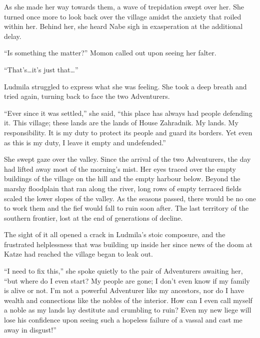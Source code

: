  

As she made her way towards them, a wave of trepidation swept over her. She turned once more to look back over the village amidst the anxiety that roiled within her. Behind her, she heard Nabe sigh in exasperation at the additional delay.

 

“Is something the matter?” Momon called out upon seeing her falter.

 

“That’s…it’s just that…”

 

Ludmila struggled to express what she was feeling. She took a deep breath and tried again, turning back to face the two Adventurers.

 

“Ever since it was settled,” she said, “this place has always had people defending it. This village; these lands are the lands of House Zahradnik. My lands. My responsibility. It is my duty to protect its people and guard its borders. Yet even as this is my duty, I leave it empty and undefended.”

 

She swept gaze over the valley. Since the arrival of the two Adventurers, the day had lifted away most of the morning’s mist. Her eyes traced over the empty buildings of the village on the hill and the empty harbour below. Beyond the marshy floodplain that ran along the river, long rows of empty terraced fields scaled the lower slopes of the valley. As the seasons passed, there would be no one to work them and the fief would fall to ruin soon after. The last territory of the southern frontier, lost at the end of generations of decline.

 

The sight of it all opened a crack in Ludmila’s stoic composure, and the frustrated helplessness that was building up inside her since news of the doom at Katze had reached the village began to leak out.

 

“I need to fix this,” she spoke quietly to the pair of Adventurers awaiting her, “but where do I even start? My people are gone; I don’t even know if my family is alive or not. I’m not a powerful Adventurer like my ancestors, nor do I have wealth and connections like the nobles of the interior. How can I even call myself a noble as my lands lay destitute and crumbling to ruin? Even my new liege will lose his confidence upon seeing such a hopeless failure of a vassal and cast me away in disgust!”

